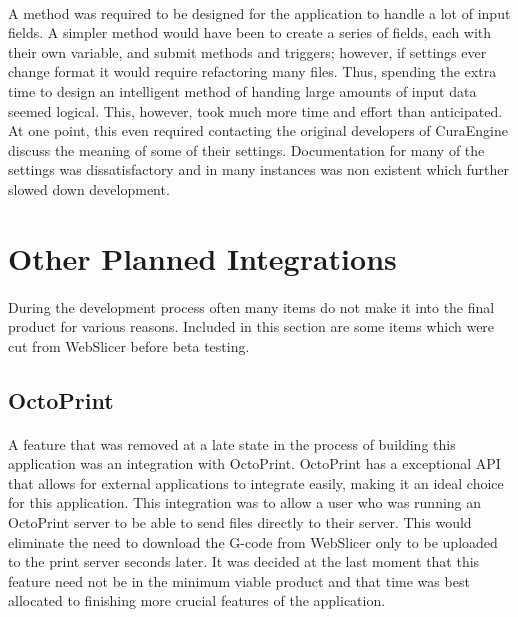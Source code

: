 \paragraph{}
A method was required to be designed for the application to handle a lot of input fields.
A simpler method would have been to create a series of fields, each with their own variable, and submit methods and triggers; however, if settings ever change format it would require refactoring many files.
Thus, spending the extra time to design an intelligent method of handing large amounts of input data seemed logical.
This, however, took much more time and effort than anticipated.
At one point, this even required contacting the original developers of CuraEngine discuss the meaning of some of their settings.
Documentation for many of the settings was dissatisfactory and in many instances was non existent which further slowed down development.

\section{Other Planned Integrations}
\paragraph{}
During the development process often many items do not make it into the final product for various reasons.
Included in this section are some items which were cut from WebSlicer before beta testing.

\subsection{OctoPrint}
\paragraph{}
A feature that was removed at a late state in the process of building this application was an integration with OctoPrint.
OctoPrint has a exceptional API that allows for external applications to integrate easily, making it an ideal choice for this application.
This integration was to allow a user who was running an OctoPrint server to be able to send files directly to their server.
This would eliminate the need to download the G-code from WebSlicer only to be uploaded to the print server seconds later.
It was decided at the last moment that this feature need not be in the minimum viable product and that time was best allocated to finishing more crucial features of the application.

